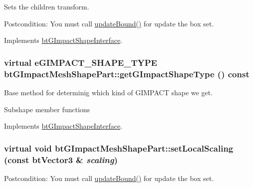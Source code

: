 Sets the children transform. 

\begin{Desc}
\item[Postcondition:]You must call \hyperlink{classbt_g_impact_shape_interface_cb26c2d7a2aecabd06b996b72b848492}{updateBound()} for update the box set. \end{Desc}


Implements \hyperlink{classbt_g_impact_shape_interface_83392f97bd7dfeb71ccdce6913a465b0}{btGImpactShapeInterface}.\hypertarget{classbt_g_impact_mesh_shape_part_5ff615b55a2bdaeba511fb116a9ab546}{
\subsubsection[getGImpactShapeType]{\setlength{\rightskip}{0pt plus 5cm}virtual eGIMPACT\_\-SHAPE\_\-TYPE btGImpactMeshShapePart::getGImpactShapeType () const}}
\label{classbt_g_impact_mesh_shape_part_5ff615b55a2bdaeba511fb116a9ab546}


Base method for determinig which kind of GIMPACT shape we get. 

Subshape member functions 

Implements \hyperlink{classbt_g_impact_shape_interface_25cacbe448997e3f8ec99cb2d4952859}{btGImpactShapeInterface}.\hypertarget{classbt_g_impact_mesh_shape_part_2c1de297d020a75e1ab0f10f7c71478f}{
\subsubsection[setLocalScaling]{\setlength{\rightskip}{0pt plus 5cm}virtual void btGImpactMeshShapePart::setLocalScaling (const btVector3 \& {\em scaling})}}
\label{classbt_g_impact_mesh_shape_part_2c1de297d020a75e1ab0f10f7c71478f}


\begin{Desc}
\item[Postcondition:]You must call \hyperlink{classbt_g_impact_shape_interface_cb26c2d7a2aecabd06b996b72b848492}{updateBound()} for update the box set. \end{Desc}


